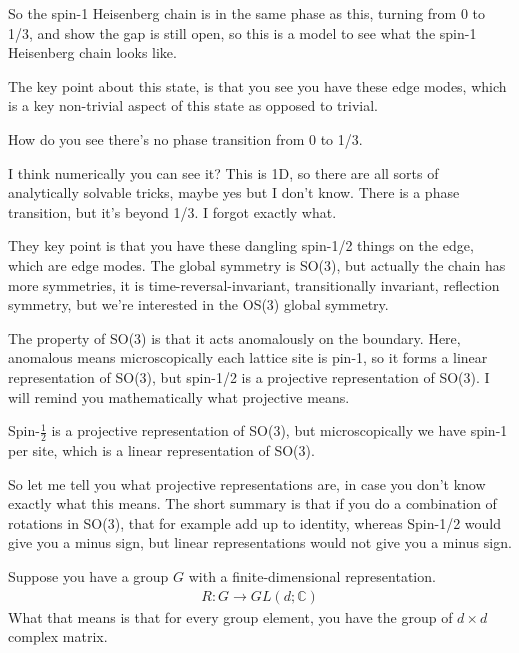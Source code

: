 So the spin-1 Heisenberg chain is in the same phase as this,
turning from 0 to 1/3,
and show the gap is still open,
so this is a model to see what the spin-1 Heisenberg chain looks like.

The key point about this state,
is that you see you have these edge modes,
which is a key non-trivial aspect of this state as opposed to trivial.

\begin{question}
    How do you see there's no phase transition from 0 to 1/3.
\end{question}
I think numerically you can see it?
This is 1D,
so there are all sorts of analytically solvable tricks,
maybe yes
but I don't know.
There is a phase transition,
but it's beyond 1/3.
I forgot exactly what.

They key point is that you have these dangling spin-1/2 things on the edge,
which are edge modes.
The global symmetry is SO(3),
but actually the chain has more symmetries,
it is time-reversal-invariant,
transitionally invariant,
reflection symmetry,
but we're interested in the OS(3) global symmetry.

The property of SO(3) is that it acts anomalously on the boundary.
Here, anomalous means microscopically each lattice site is pin-1,
so it forms a linear representation of SO(3),
but spin-1/2 is a projective representation of SO(3).
I will remind you mathematically what projective means.

Spin-$\frac{1}{2}$ is a projective representation of SO(3),
but microscopically we have spin-1 per site,
which is a linear representation of SO(3).

So let me tell you what projective representations are,
in case you don't know exactly what this means.
The short summary is that if you do a combination of rotations in SO(3),
that for example add up to identity,
whereas Spin-1/2 would give you a minus sign,
but linear representations would not give you a minus sign.

Suppose you have a group $G$ with a finite-dimensional representation.
\begin{align}
    R: G \to GL(d; \mathbb{C})
\end{align}
What that means is that for every group element,
you have the group of $d\times d$ complex matrix.

